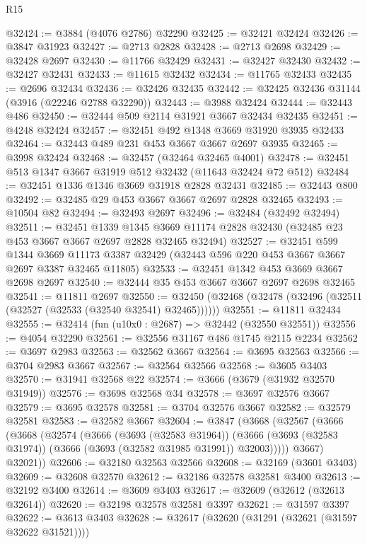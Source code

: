 \begin{lexlean}{R15}
\begin{coremodule}
@32424 := @3884 (@4076 @2786) @32290
@32425 := @32421 @32424
@32426 := @3847 @31923
@32427 := @2713 @2828
@32428 := @2713 @2698
@32429 := @32428 @2697
@32430 := @11766 @32429
@32431 := @32427 @32430
@32432 := @32427 @32431
@32433 := @11615 @32432
@32434 := @11765 @32433
@32435 := @2696 @32434
@32436 := @32426 @32435
@32442 := @32425 @32436 @31144 (@3916 (@22246 @2788 @32290))
@32443 := @3988 @32424
@32444 := @32443 @486
@32450 := @32444 @509 @2114 @31921 @3667 @32434 @32435
@32451 := @4248 @32424
@32457 := @32451 @492 @1348 @3669 @31920 @3935 @32433
@32464 := @32443 @489 @231 @453 @3667 @3667 @2697 @3935
@32465 := @3998 @32424
@32468 := @32457 (@32464 @32465 @4001)
@32478 := @32451 @513 @1347 @3667 @31919 @512 @32432 (@11643 @32424 @72 @512)
@32484 := @32451 @1336 @1346 @3669 @31918 @2828 @32431
@32485 := @32443 @800
@32492 := @32485 @29 @453 @3667 @3667 @2697 @2828 @32465
@32493 := @10504 @82
@32494 := @32493 @2697
@32496 := @32484 (@32492 @32494)
@32511 := @32451
    @1339
    @1345
    @3669
    @11174
    @2828
    @32430
    (@32485 @23 @453 @3667 @3667 @2697 @2828 @32465 @32494)
@32527 := @32451
    @599
    @1344
    @3669
    @11173
    @3387
    @32429
    (@32443 @596 @220 @453 @3667 @3667 @2697 @3387 @32465 @11805)
@32533 := @32451 @1342 @453 @3669 @3667 @2698 @2697
@32540 := @32444 @35 @453 @3667 @3667 @2697 @2698 @32465
@32541 := @11811 @2697
@32550 := @32450 (@32468 (@32478 (@32496 (@32511 (@32527 (@32533 (@32540 @32541) @32465))))))
@32551 := @11811 @32434
@32555 := @32414 (fun (u10x0 : @2687) => @32442 (@32550 @32551))
@32556 := @4054 @32290
@32561 := @32556 @31167 @486 @1745 @2115 @2234
@32562 := @3697 @2983
@32563 := @32562 @3667
@32564 := @3695 @32563
@32566 := @3704 @2983 @3667
@32567 := @32564 @32566
@32568 := @3605 @3403
@32570 := @31941 @32568 @22
@32574 := @3666 (@3679 (@31932 @32570 @31949))
@32576 := @3698 @32568 @34
@32578 := @3697 @32576 @3667
@32579 := @3695 @32578
@32581 := @3704 @32576 @3667
@32582 := @32579 @32581
@32583 := @32582 @3667
@32604 := @3847
    (@3668
      (@32567
        (@3666
          (@3668
            (@32574
              (@3666
                (@3693 (@32583 @31964))
                (@3666 (@3693 (@32583 @31974)) (@3666 (@3693 (@32582 @31985 @31991)) @32003)))))
          @3667)
        @32021))
@32606 := @32180 @32563 @32566
@32608 := @32169 (@3601 @3403)
@32609 := @32608 @32570
@32612 := @32186 @32578 @32581 @3400
@32613 := @32192 @3400
@32614 := @3609 @3403
@32617 := @32609 (@32612 (@32613 @32614))
@32620 := @32198 @32578 @32581 @3397
@32621 := @31597 @3397
@32622 := @3613 @3403
@32628 := @32617 (@32620 (@31291 (@32621 (@31597 @32622 @31521))))

\end{coremodule}
\end{lexlean}
